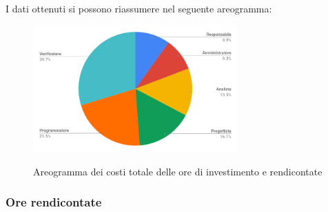 \pagebreak
I dati ottenuti si possono riassumere nel seguente areogramma:
\begin{figure}[H] 
			\centering 
				\includegraphics[width=0.7\textwidth]{res/images/areogramma_riepilogo.png}\\
				\caption{Areogramma dei costi totale delle ore di investimento e rendicontate}
			\label{AreogrammaRiepilogoRuoli}
\end{figure}


\subsubsection{Ore rendicontate}
